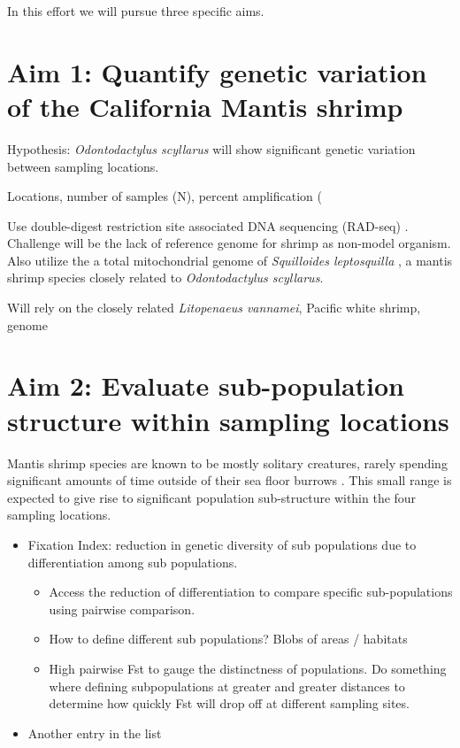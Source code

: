 \documentclass[11pt]{article}
\begin{document}
In this effort we will pursue three specific aims. 


\section*{Aim 1: Quantify genetic variation of the California Mantis shrimp}
Hypothesis: \emph{Odontodactylus scyllarus} will show significant genetic variation between sampling locations.

Locations,   number   of   samples   (N),   percent amplification  (%



Use double-digest restriction site associated DNA sequencing (RAD-seq) \cite{Peterson2012}. Challenge will be the lack of reference genome for shrimp as non-model organism. Also utilize the a total mitochondrial genome of \emph{Squilloides leptosquilla} \cite{Kang2015}, a mantis shrimp species closely related to \emph{Odontodactylus scyllarus}. 

Will rely on the closely related \emph{Litopenaeus vannamei},  Pacific white shrimp, genome \cite{Zhang2019}


\section*{Aim 2: Evaluate sub-population structure within sampling locations}
Mantis shrimp species are known to be mostly solitary creatures, rarely spending significant amounts of time outside of their sea floor burrows \cite{Mead2010}. This small range is expected to give rise to significant population sub-structure within the four sampling locations. 


\begin{itemize}
	\item Fixation Index: reduction in genetic diversity of sub populations due to differentiation among sub populations.
	\begin{itemize}
		\item Access the reduction of differentiation to compare specific sub-populations using pairwise comparison. 
		\item How to define different sub populations? Blobs of areas / habitats
		\item High pairwise Fst to gauge the distinctness of populations. Do something where defining subpopulations 
		at greater and greater distances to determine how quickly Fst will drop off at different sampling sites. 
	\end{itemize}
	\item Another entry in the list
\end{itemize}
\end{document}

